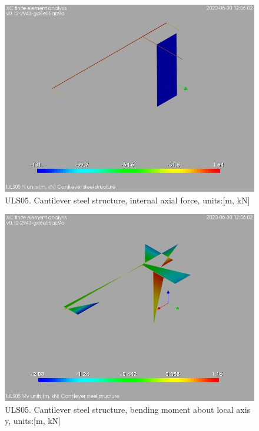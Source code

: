 \begin{figure}
\begin{center}
\includegraphics[width=\linewidth]{ramp_wall/resLC/text/graphics/resSimplLC/lULS05steelMembersN}
\caption{ULS05. Cantilever steel structure, internal axial force, units:[m, kN]}
\end{center}
\end{figure}
\begin{figure}
\begin{center}
\includegraphics[width=\linewidth]{ramp_wall/resLC/text/graphics/resSimplLC/lULS05steelMembersMy}
\caption{ULS05. Cantilever steel structure, bending moment about local axis y, units:[m, kN]}
\end{center}
\end{figure}
